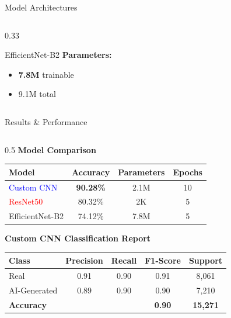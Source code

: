 \documentclass[aspectratio=169]{beamer}
\begin{document}
\begin{frame}{Model Architectures}
\begin{columns}[T]
\begin{column}{0.33\textwidth}
\begin{block}{EfficientNet-B2}
                \textbf{Parameters:}
                \begin{itemize}
                    \scriptsize
                    \item \textbf{7.8M} trainable
                    \item 9.1M total
                \end{itemize}
            \end{block}
        \end{column}
    \end{columns}
\end{frame}

\begin{frame}{Results \& Performance}
    \begin{columns}[T]
        \begin{column}{0.5\textwidth}
          \vspace{-0.2cm}
            \textbf{Model Comparison}
            \begin{table}[h]
                \small
                \begin{tabular}{lccc}
                    \toprule
                    \textbf{Model} & \textbf{Accuracy} & \textbf{Parameters} & \textbf{Epochs} \\
                    \midrule
                    \textcolor{blue}{Custom CNN} & \textbf{90.28\%} & 2.1M & 10 \\
                    \textcolor{red}{ResNet50} & 80.32\% & 2K & 5 \\
                    \textcolor{green!60!black}{EfficientNet-B2} & 74.12\% & 7.8M & 5 \\
                    \bottomrule
                \end{tabular}
            \end{table}
            
            \vspace{-0.1cm}
            \textbf{Custom CNN Classification Report}
            \begin{table}[h]
                \tiny
                \begin{tabular}{lcccc}
                    \toprule
                    \textbf{Class} & \textbf{Precision} & \textbf{Recall} & \textbf{F1-Score} & \textbf{Support} \\
                    \midrule
                    Real & 0.91 & 0.90 & 0.91 & 8,061 \\
                    AI-Generated & 0.89 & 0.90 & 0.90 & 7,210 \\
                    \midrule
                    \textbf{Accuracy} & & & \textbf{0.90} & \textbf{15,271} \\
                    \bottomrule
                \end{tabular}
            \end{table}
            

\end{column}
\end{columns}
\end{frame}
\end{document}
